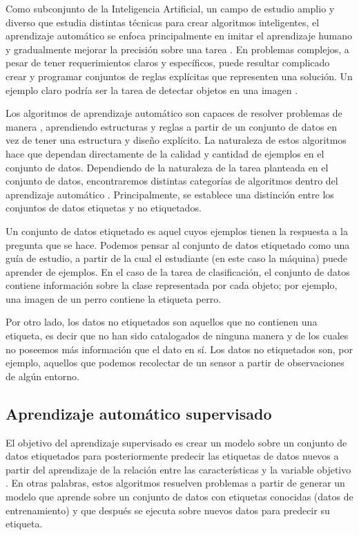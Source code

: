 Como subconjunto de la Inteligencia Artificial, un campo de estudio amplio y diverso que estudia distintas técnicas para crear algoritmos inteligentes, el aprendizaje automático se enfoca principalmente en imitar el aprendizaje humano y gradualmente mejorar la precisión sobre una tarea \cite{ibm_what_nodate}. En problemas complejos, a pesar de tener requerimientos claros y específicos, puede resultar complicado crear y programar conjuntos de reglas explícitas que representen una solución. Un ejemplo claro podría ser la tarea de detectar objetos en una imagen \cite{rebala_introduction_2019}.

Los algoritmos de aprendizaje automático son capaces de resolver problemas de manera , aprendiendo estructuras y reglas a partir de un conjunto de datos en vez de tener una estructura y diseño explícito.  La naturaleza de estos algoritmos hace que dependan directamente de la calidad y cantidad de ejemplos en el conjunto de datos. Dependiendo de la naturaleza de la tarea planteada en el conjunto de datos, encontraremos distintas categorías de algoritmos dentro del aprendizaje automático \cite{rebala_introduction_2019}. Principalmente, se establece una distinción entre los conjuntos de datos etiquetas y no etiquetados.

Un conjunto de datos etiquetado es aquel cuyos ejemplos tienen la respuesta a la pregunta que se hace. Podemos pensar al conjunto de datos etiquetado como una guía de estudio, a partir de la cual el estudiante (en este caso la máquina) puede aprender de ejemplos. En el caso de la tarea de clasificación, el conjunto de datos contiene información sobre la clase representada por cada objeto; por ejemplo, una imagen de un perro contiene la etiqueta perro. 

Por otro lado, los datos no etiquetados son aquellos que no contienen una etiqueta, es decir que no han sido catalogados de ninguna manera y de los cuales no poseemos más información que el dato en sí. Los datos no etiquetados son, por ejemplo, aquellos que podemos recolectar de un sensor a partir de observaciones de algún entorno.

\subsection{Aprendizaje automático supervisado}
El objetivo del aprendizaje supervisado es crear un modelo sobre un conjunto de datos etiquetados para posteriormente predecir las etiquetas de datos nuevos a partir del aprendizaje de la relación entre las características y la variable objetivo \cite{rebala_introduction_2019}. En otras palabras, estos algoritmos resuelven problemas a partir de generar un modelo que aprende sobre un conjunto de datos con etiquetas conocidas (datos de entrenamiento) y que después se ejecuta sobre nuevos datos para predecir su etiqueta. 

